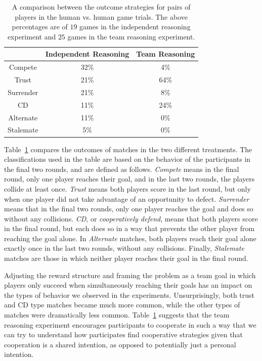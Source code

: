 
\begin{table}
\begin{center}	
\begin{tabular}{|c|c|c|}									   \hline
~ 			& Independent Reasoning 	& Team Reasoning 	\\ \hline
 Compete		& 32\% 					& 4\% 			\\ \hline
 Trust		& 21\% 					& 64\% 			\\ \hline
 Surrender	& 21\% 					& 8\% 			\\ \hline
 CD			& 11\% 					& 24\% 			\\ \hline
 Alternate		& 11\% 					& 0\% 			\\ \hline
 Stalemate	& 5\% 					& 0\% 			\\ \hline
 \end{tabular}
\end{center}
\caption{ A comparison between the outcome strategies for pairs of players in the human vs. human game trials. The above 
percentages are of $19$ games in the independent reasoning experiment and $25$ games in the team reasoning experiment.}
\label{tab:class}		
\end{table} 

Table~\ref{tab:class} compares the outcomes of matches in the two
different treatments.  The classifications used in the table are based
on the behavior of the participants in the final two rounds, and are
defined as follows. \emph{Compete\/} means in the final round, only
one player reaches their goal, and in the last two rounds, the players
collide at least once.  \emph{Trust\/} means both players score in the
last round, but only when one player did not take advantage of an
opportunity to defect.  \emph{Surrender\/} means that in the final two
rounds, only one player reaches the goal and does so without any
collisions.  \emph{CD}, or \emph{cooperatively defend}, means that
both players score in the final round, but each does so in a way that
prevents the other player from reaching the goal alone.  In
\emph{Alternate} matches, both players reach their goal alone exactly
once in the last two rounds, without any collisions.  Finally,
\emph{Stalemate} matches are those in which neither player reaches
their goal in the final round.

Adjusting the reward structure and framing the problem as a team goal in which players only succeed when simultaneously reaching their goals
has an impact on the types of behavior we observed in the experiments. Unsurprisingly, both trust and CD type matches became much more common,
while the other types of matches were dramatically less common. Table~\ref{tab:class} suggests that the team reasoning experiment encourages 
participants to cooperate in such a way that we can try to understand how participates find cooperative strategies given that cooperation is a shared intention, 
as opposed to potentially just a personal intention.


